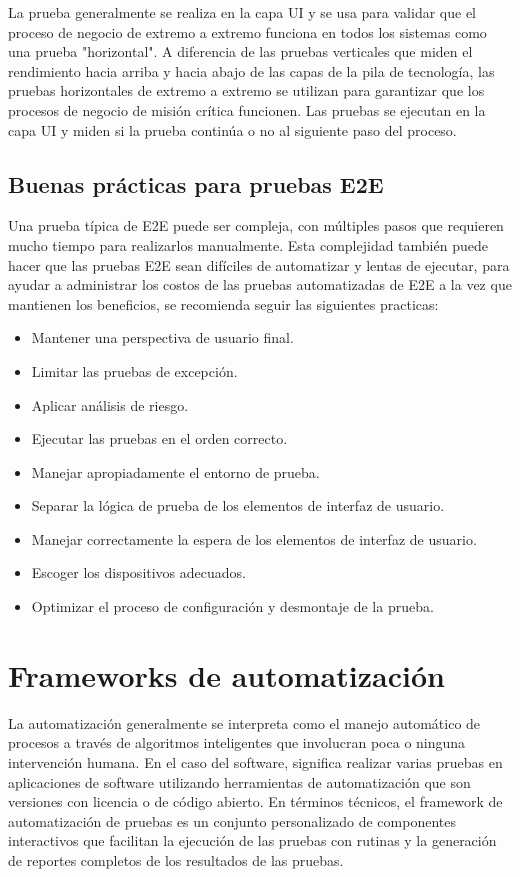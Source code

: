 La prueba generalmente se realiza en la capa UI y se usa para validar que el
proceso de negocio de extremo a extremo funciona en todos los sistemas como una
prueba "horizontal". A diferencia de las pruebas verticales que miden el
rendimiento hacia arriba y hacia abajo de las capas de la pila de tecnología,
las pruebas horizontales de extremo a extremo se utilizan para garantizar que
los procesos de negocio de misión crítica funcionen. Las pruebas se ejecutan en
la capa UI y miden si la prueba continúa o no al siguiente paso del proceso.

\subsection{Buenas prácticas para pruebas E2E}
Una prueba típica de E2E puede ser compleja, con múltiples pasos que requieren
mucho tiempo para realizarlos manualmente. Esta complejidad también puede hacer
que las pruebas E2E sean difíciles de automatizar y lentas de ejecutar, para
ayudar a administrar los costos de las pruebas automatizadas de E2E a la vez que
mantienen los beneficios, se recomienda seguir las siguientes practicas:

\begin{itemize}
    \item Mantener una perspectiva de usuario final.
    \item Limitar las pruebas de excepción.
    \item Aplicar análisis de riesgo.
    \item Ejecutar las pruebas en el orden correcto.
    \item Manejar apropiadamente el entorno de prueba.
    \item Separar la lógica de prueba de los elementos de interfaz de usuario.
    \item Manejar correctamente la espera de los elementos de interfaz de
        usuario.
    \item Escoger los dispositivos adecuados.
    \item Optimizar el proceso de configuración y desmontaje de la prueba.
\end{itemize}

\section{Frameworks de automatización}
La automatización generalmente se interpreta como el manejo automático de
procesos a través de algoritmos inteligentes que involucran poca o ninguna
intervención humana. En el caso del software, significa realizar varias pruebas
en aplicaciones de software utilizando herramientas de automatización que son
versiones con licencia o de código abierto. En términos técnicos, el framework
de automatización de pruebas es un conjunto personalizado de componentes
interactivos que facilitan la ejecución de las pruebas con rutinas y la
generación de reportes completos de los resultados de las pruebas.

